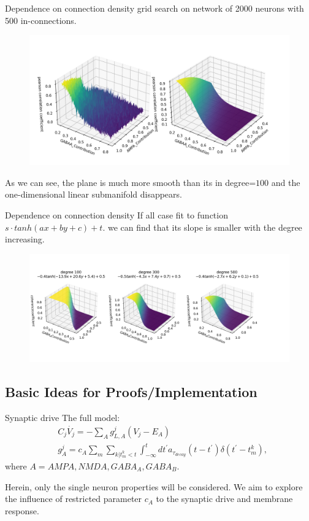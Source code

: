 \documentclass{beamer}
\begin{document}
\begin{frame}{Dependence on connection density}
	grid search on network of 2000 neurons with 500 in-connections.
	\begin{figure}[htbp]
		\centering
		\includegraphics[width=0.85\linewidth]{fig/degree_influence_3d}
	\end{figure}
	As we can see, the plane is much more smooth than its in degree=$ 100 $ and the one-dimensional linear submanifold disappears.
\end{frame}

\begin{frame}{Dependence on connection density}
	If all case fit to function $ s\cdot tanh(ax+by+c) + t $. we can find that its slope is smaller with the degree increasing.
	\begin{figure}[htbp]
		\centering
		\includegraphics[width=0.85\linewidth]{fig/fit_surface}
	\end{figure}
	
\end{frame}


\subsection{Basic Ideas for Proofs/Implementation}

\begin{frame}{Synaptic drive}
	The full model:
		\begin{equation*}
		\begin{aligned}
			&C_{j} \dot{V_{j}}  = - \sum_{A}g_{L, A}^{j}(V_{j} - E_{A}) \\
			&g_{A}^{j}=c_{A}\sum_{m} \sum_{k|t_{m}^{k}<t}\int_{-\infty}^{t}dt^{\prime}a_{\tau_{decay}}\left(t - t^{\prime}\right) \delta(t^{\prime}-t_{m}^{k}), 
		\end{aligned}
		\end{equation*}
	where $ A= AMPA, NMDA, GABA_{A}, GABA_{B} $.
	\par 
	Herein, only the single neuron properties will be considered. We aim to explore the influence of  restricted parameter $ c_{A} $ to the synaptic drive and membrane response.

\end{frame}
\end{document}
